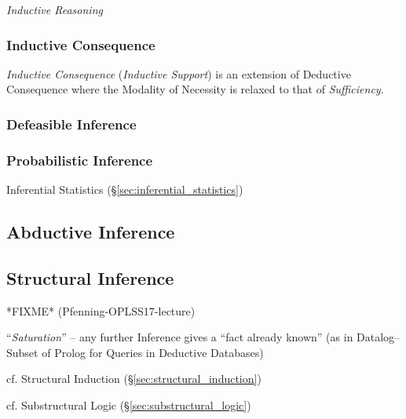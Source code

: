 \emph{Inductive Reasoning}



\subsubsection{Inductive Consequence}\label{sec:inductive_consequence}

\emph{Inductive Consequence} (\emph{Inductive Support}) is an
extension of Deductive Consequence where the Modality of Necessity is
relaxed to that of \emph{Sufficiency}.



\subsubsection{Defeasible Inference}\label{sec:defeasible_inference}

\subsubsection{Probabilistic Inference}\label{sec:probabilistic_inference}

Inferential Statistics (\S\ref{sec:inferential_statistics})



\subsection{Abductive Inference}\label{sec:abductive_inference}

\subsection{Structural Inference}\label{sec:structural_inference}

*FIXME* (Pfenning-OPLSS17-lecture)

``\emph{Saturation}'' -- any further Inference gives a ``fact already
known'' (as in Datalog-- Subset of Prolog for Queries in Deductive
Databases)

\fist cf. Structural Induction (\S\ref{sec:structural_induction})

\fist cf. Substructural Logic (\S\ref{sec:substructural_logic})



